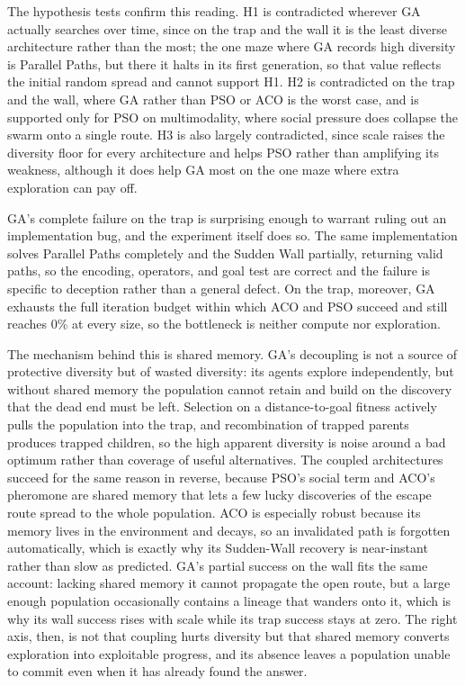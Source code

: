 \documentclass[11pt,a4paper]{article}
\begin{document}
    The hypothesis tests confirm this reading. H1 is contradicted wherever GA actually searches over time, since on the trap and the wall it is the least diverse architecture rather than the most; the one maze where GA records high diversity is Parallel Paths, but there it halts in its first generation, so that value reflects the initial random spread and cannot support H1. H2 is contradicted on the trap and the wall, where GA rather than PSO or ACO is the worst case, and is supported only for PSO on multimodality, where social pressure does collapse the swarm onto a single route. H3 is also largely contradicted, since scale raises the diversity floor for every architecture and helps PSO rather than amplifying its weakness, although it does help GA most on the one maze where extra exploration can pay off.

    GA's complete failure on the trap is surprising enough to warrant ruling out an implementation bug, and the experiment itself does so. The same implementation solves Parallel Paths completely and the Sudden Wall partially, returning valid paths, so the encoding, operators, and goal test are correct and the failure is specific to deception rather than a general defect. On the trap, moreover, GA exhausts the full iteration budget within which ACO and PSO succeed and still reaches 0\% at every size, so the bottleneck is neither compute nor exploration.

    The mechanism behind this is shared memory. GA's decoupling is not a source of protective diversity but of wasted diversity: its agents explore independently, but without shared memory the population cannot retain and build on the discovery that the dead end must be left. Selection on a distance-to-goal fitness actively pulls the population into the trap, and recombination of trapped parents produces trapped children, so the high apparent diversity is noise around a bad optimum rather than coverage of useful alternatives. The coupled architectures succeed for the same reason in reverse, because PSO's social term and ACO's pheromone are shared memory that lets a few lucky discoveries of the escape route spread to the whole population. ACO is especially robust because its memory lives in the environment and decays, so an invalidated path is forgotten automatically, which is exactly why its Sudden-Wall recovery is near-instant rather than slow as predicted. GA's partial success on the wall fits the same account: lacking shared memory it cannot propagate the open route, but a large enough population occasionally contains a lineage that wanders onto it, which is why its wall success rises with scale while its trap success stays at zero. The right axis, then, is not that coupling hurts diversity but that shared memory converts exploration into exploitable progress, and its absence leaves a population unable to commit even when it has already found the answer.
\end{document}
